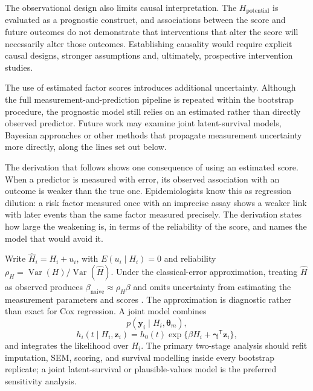 The observational design also limits causal interpretation. The $H_{\text{potential}}$ is evaluated as a prognostic construct, and associations between the score and future outcomes do not demonstrate that interventions that alter the score will necessarily alter those outcomes. Establishing causality would require explicit causal designs, stronger assumptions and, ultimately, prospective intervention studies.

The use of estimated factor scores introduces additional uncertainty. Although the full measurement-and-prediction pipeline is repeated within the bootstrap procedure, the prognostic model still relies on an estimated rather than directly observed predictor. Future work may examine joint latent-survival models, Bayesian approaches or other methods that propagate measurement uncertainty more directly, along the lines set out below.

The derivation that follows shows one consequence of using an estimated score.
When a predictor is measured with error, its observed association with an
outcome is weaker than the true one. Epidemiologists know this as regression
dilution: a risk factor measured once with an imprecise assay shows a weaker
link with later events than the same factor measured precisely. The derivation
states how large the weakening is, in terms of the reliability of the score, and
names the model that would avoid it.

\begin{derivation}
\label{der:uncertainty}
Write $\widehat H_i=H_i+u_i$, with $E(u_i\mid H_i)=0$ and reliability
$\rho_H=\operatorname{Var}(H)/\operatorname{Var}(\widehat H)$. Under the
classical-error approximation, treating $\widehat H$ as observed produces
$\beta_{\mathrm{naive}}\approx\rho_H\beta$ and omits uncertainty from
estimating the measurement parameters and scores \citep{prentice_1982}. The
approximation is diagnostic rather than exact for Cox regression. A joint model combines
\[
 p(\mathbf y_i\mid H_i,\boldsymbol\theta_m),
\]
\[
 h_i(t\mid H_i,\mathbf z_i)=h_0(t)
 \exp\{\beta H_i+\boldsymbol\gamma^{\mathsf T}\mathbf z_i\},
\]
and integrates the likelihood over $H_i$. The primary two-stage analysis should
refit imputation, SEM, scoring, and survival modelling inside every bootstrap
replicate; a joint latent-survival or plausible-values model is the preferred
sensitivity analysis.
\end{derivation}

